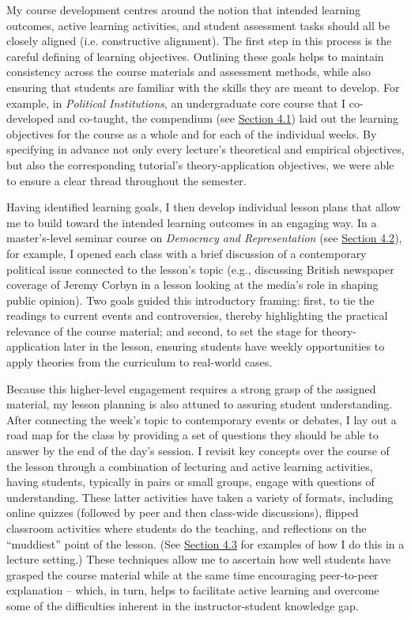 \documentclass[11pt]{article}
\begin{document}
My course development centres around the notion that intended learning outcomes, active learning activities, and student assessment tasks should all be closely aligned (i.e. constructive alignment). The first step in this process is the careful defining of learning objectives. Outlining these goals helps to maintain consistency across the course materials and assessment methods, while also ensuring that students are familiar with the skills they are meant to develop. For example, in \textit{Political Institutions}, an undergraduate core course that I co-developed and co-taught, the compendium (see \hyperref[sec:compendium]{Section 4.1}) laid out the learning objectives for the course as a whole and for each of the individual weeks. By specifying in advance not only every lecture's theoretical and empirical objectives, but also the corresponding tutorial's theory-application objectives, we were able to ensure a clear thread throughout the semester. 

Having identified learning goals, I then develop individual lesson plans that allow me to build toward the intended learning outcomes in an engaging way. In a master's-level seminar course on \textit{Democracy and Representation} (see \hyperref[sec:syllabus]{Section 4.2}), for example, I opened each class with a brief discussion of a contemporary political issue connected to the lesson's topic (e.g., discussing British newspaper coverage of Jeremy Corbyn in a lesson looking at the media's role in shaping public opinion). Two goals guided this introductory framing: first, to tie the readings to current events and controversies, thereby highlighting the practical relevance of the course material; and second, to set the stage for theory-application later in the lesson, ensuring students have weekly opportunities to apply theories from the curriculum to real-world cases. 

Because this higher-level engagement requires a strong grasp of the assigned material, my lesson planning is also attuned to assuring student understanding. After connecting the week's topic to contemporary events or debates, I lay out a road map for the class by providing a set of questions they should be able to answer by the end of the day's session. I revisit key concepts over the course of the lesson through a combination of lecturing and active learning activities, having students, typically in pairs or small groups, engage with questions of understanding. These latter activities have taken a variety of formats, including online quizzes (followed by peer and then class-wide discussions), flipped classroom activities where students do the teaching, and reflections on the ``muddiest'' point of the lesson. (See \hyperref[sec:activities]{Section 4.3} for examples of how I do this in a lecture setting.) These techniques allow me to ascertain how well students have grasped the course material while at the same time encouraging peer-to-peer explanation -- which, in turn, helps to facilitate active learning and overcome some of the difficulties inherent in the instructor-student knowledge gap.
\end{document}
